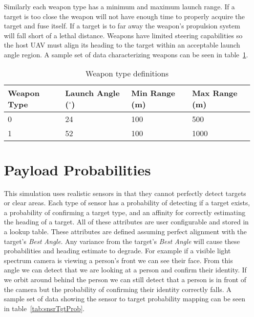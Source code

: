 Similarly each weapon type has a minimum and maximum launch range.  If a target is too close the weapon will not have enough time to properly acquire the target and fuse itself.   If a target is to far away the weapon's propulsion system will fall short of a lethal distance.  Weapons have limited steering capabilities so the host UAV must align its heading to the target within an acceptable launch angle region. A sample set of data characterizing weapons can be seen in table~\ref{tab:weaponType}.

\begin{table}[h]
	\caption{Weapon type definitions}
	\centering
	\label{tab:weaponType}
	\begin{tabular}{|p{1.5cm}|p{1.75cm}|p{1cm}|p{1cm}|}
		\hline
		Weapon Type & Launch Angle ($^{\circ}$) & Min Range (m) & Max Range (m)\\ \hline
		0 & 24 & 100 & 500 \\
		1 & 52 & 100 & 1000 \\
		\hline
	\end{tabular}
\end{table}

\section{Payload Probabilities}
This simulation uses realistic sensors in that they cannot perfectly detect targets or clear areas.  Each type of sensor has a probability of detecting if a target exists, a probability of confirming a target type, and an affinity for correctly estimating the heading of a target.  All of these attributes are user configurable and stored in a lookup table.  These attributes are defined assuming perfect alignment with the target's \textit{Best Angle}.  Any variance from the target's \textit{Best Angle} will cause these probabilities and heading estimate to degrade.  For example if a visible light spectrum camera is viewing a person's front we can see their face.  From this angle we can detect that we are looking at a person and confirm their identity.  If we orbit around behind the person we can still detect that a person is in front of the camera but the probability of confirming their identity correctly falls.  A sample set of data showing the sensor to target probability mapping can be seen in table~\ref{tab:snsrTgtProb}.

